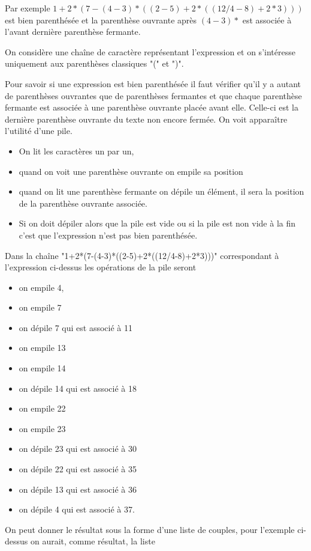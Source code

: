 Par exemple $1 + 2*(7-(4-3)*((2-5)+2*((12/4-8)+2*3)))$ est bien parenthésée et la parenthèse ouvrante après $(4-3)*$ est associée à l'avant dernière parenthèse fermante.

On considère une chaîne de caractère représentant l'expression et on s'intéresse uniquement aux parenthèses classiques "(" et ")".

Pour savoir si une expression est bien parenthésée il faut vérifier qu'il y a autant de parenthèses ouvrantes que de parenthèses fermantes et que chaque parenthèse fermante est associée à une parenthèse ouvrante placée avant elle. Celle-ci est la dernière parenthèse ouvrante du texte non encore fermée. On voit apparaître l'utilité d'une pile.

\begin{itemize}
\item On lit les caractères un par un,
\item quand on voit une parenthèse ouvrante on empile sa position
\item quand on lit une parenthèse fermante on dépile un élément, il sera la position de la parenthèse ouvrante associée.
\item Si on doit dépiler alors que la pile est vide ou si la pile est non vide à la fin c'est que l'expression n'est pas bien parenthésée.
\end{itemize}

Dans la chaîne "1+2*(7-(4-3)*((2-5)+2*((12/4-8)+2*3)))" correspondant à l'expression ci-dessus les opérations de la pile seront 
\begin{itemize}
\item on empile 4,
\item on empile 7 
\item on dépile 7 qui est associé à 11
\item on empile 13 
\item on empile 14 
\item on dépile 14 qui est associé à 18
\item on empile 22 
\item on empile 23
\item on dépile 23 qui est associé à 30
\item on dépile 22 qui est associé à 35
\item on dépile 13 qui est associé à 36
\item on dépile 4 qui est associé à 37.
\end{itemize}

On peut donner le résultat sous la forme d'une liste de couples, pour l'exemple ci-dessus on aurait, comme résultat, la liste 

